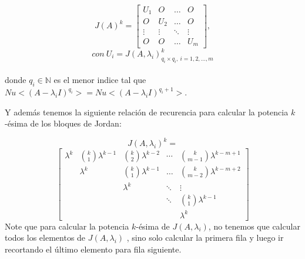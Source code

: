 \documentclass[12pt,a4paper]{article}
\begin{document}
\begin{multicols}{2}
	$$
	J(A)^k = \begin{bmatrix}
	U_{1}&O&\ldots&O\\
	O&U_{2}&\ldots&O\\
	\vdots&\vdots& \ddots& \vdots\\
	O&O&\ldots&U_{m}
	\end{bmatrix},
	$$
	$$ con \ U_{i}=J(A, \lambda_{i})^k_{q_{i}\times q_{i}, \ i=1, 2,..., m}$$
	\\
	donde $q_{i}\in\mathbb{N}$ es el menor indice tal que $Nu<(A-\lambda_{i}I)^{q_{i}}> = Nu<(A-\lambda_{i}I)^{q_{i}+1}>$.
	
	\noindent Y además tenemos la siguiente relación de recurencia para calcular la potencia $k$-ésima de los bloques de Jordan:
	
	$$J(A, \lambda_{i})^{k}=$$$$\begin{bmatrix}
	\lambda^{k} & {k \choose 1}\lambda^{k-1}   & {k \choose 2}\lambda^{k-2} & \cdots       & {k \choose m-1}\lambda^{k-m+1}\\
	& \lambda^{k}                &  {k \choose 1}\lambda^{k-1} & \dots       & {k \choose m-2}\lambda^{k-m+2}\\
	&                            &  \lambda^{k}                & \ddots     &  \vdots\\                  &                            &                             & \ddots     & {k \choose 1}\lambda^{k-1}\\                  &                            &                             &             & \lambda^{k}
	\end{bmatrix}$$
	Note que para calcular la potencia $k$-ésima de $J(A,\lambda_{i})$, no tenemos que calcular todos los elementos de $J(A, \lambda_{i})$ , sino solo calcular la primera fila y luego ir recortando el último elemento para fila siguiente.
	
	
	
	
	
	
	
	
	

\end{multicols}
\end{document}
